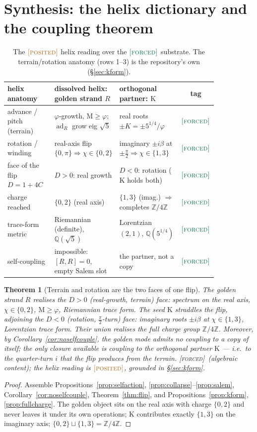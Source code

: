 \documentclass[11pt]{article}
\theoremstyle{plain}
\newtheorem{theorem}{Theorem}[section]
\theoremstyle{definition}
\theoremstyle{remark}
\newcommand{\forced}{\textup{\textcolor{forcedc}{\textsc{[forced]}}}}
\newcommand{\posited}{\textup{\textcolor{positedc}{\textsc{[posited]}}}}
\newcommand{\Q}{\mathbb{Q}}
\newcommand{\Z}{\mathbb{Z}}
\newcommand{\Mah}{\mathrm{M}}
\newcommand{\adR}{\operatorname{ad}_R}
\newcommand{\Kf}{\mathrm{K}}
\begin{document}
\section{Synthesis: the helix dictionary and the coupling theorem}\label{sec:synthesis}

\begin{table}[h]\centering\small
\renewcommand{\arraystretch}{1.3}
\begin{tabular}{@{}p{0.235\linewidth} p{0.30\linewidth} p{0.30\linewidth} c@{}}
\toprule
helix anatomy & dissolved helix: golden strand $R$ & orthogonal partner: $\Kf$ & tag \\
\midrule
advance / pitch (terrain) & $\varphi$-growth, $\Mah\ge\varphi$; $\adR$ grow eig $\sqrt5$ & real roots $\pm K=\pm5^{1/4}/\varphi$ & $\forced$ \\
rotation / winding & real-axis flip $\{0,\pi\}\Rightarrow\chi\in\{0,2\}$ & imaginary $\pm i\beta$ at $\pm\tfrac\pi2\Rightarrow\chi\in\{1,3\}$ & $\forced$ \\
face of the flip $D=1+4C$ & $D>0$: real growth & $D<0$: rotation ($\Kf$ holds both) & $\forced$ \\
charge reached & $\{0,2\}$ (real axis) & $\{1,3\}$ (imag.) $\Rightarrow$ completes $\Z/4\Z$ & $\forced$ \\
trace-form metric & Riemannian (definite), $\Q(\sqrt5)$ & Lorentzian $(2,1)$, $\Q(5^{1/4})$ & $\forced$ \\
self-coupling & impossible: $[R,R]=0$, empty Salem slot & the partner, not a copy & $\forced$ \\
\bottomrule
\end{tabular}
\caption{The $\posited$ helix reading over the $\forced$ substrate. The terrain/rotation anatomy
(rows 1--3) is the repository's own (\S\ref{sec:kform}).}
\end{table}

\begin{theorem}[Terrain and rotation are the two faces of one flip]\label{thm:main}
The golden strand $R$ realises the $D>0$ (real-growth, \emph{terrain}) face: spectrum on the real axis,
$\chi\in\{0,2\}$, $\Mah\ge\varphi$, Riemannian trace form. The seed $\Kf$ straddles the flip, adjoining the
$D<0$ (\emph{rotation}, $\tfrac{\pi}{2}$-turn) face: imaginary roots $\pm i\beta$ at $\chi\in\{1,3\}$, Lorentzian
trace form. Their union realises the full charge group $\Z/4\Z$. Moreover, by
Corollary~\ref{cor:noselfcouple}, the golden mode admits \emph{no} coupling to a copy of itself; the only
closure available is coupling to the orthogonal partner $\Kf$ --- i.e.\ to the quarter-turn $i$ that the flip
produces from the terrain. \forced\ (algebraic content); the helix reading is $\posited$, grounded in
\S\ref{sec:kform}.
\end{theorem}
\begin{proof}
Assemble Propositions~\ref{prop:selfaction}, \ref{prop:collapse}--\ref{prop:salem},
Corollary~\ref{cor:noselfcouple}, Theorem~\ref{thm:flip}, and Propositions~\ref{prop:kform},
\ref{prop:fullcharge}. The golden object sits on the real axis with charge $\{0,2\}$ and never leaves it under
its own operations; $\Kf$ contributes exactly $\{1,3\}$ on the imaginary axis; $\{0,2\}\sqcup\{1,3\}=\Z/4\Z$.
\end{proof}
\end{document}
